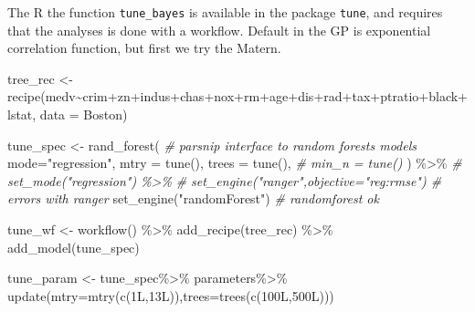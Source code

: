 \documentclass[
  ignorenonframetext,
]{beamer}
\newenvironment{Shaded}{\begin{snugshade}}{\end{snugshade}}
\newcommand{\AttributeTok}[1]{\textcolor[rgb]{0.77,0.63,0.00}{#1}}
\newcommand{\CommentTok}[1]{\textcolor[rgb]{0.56,0.35,0.01}{\textit{#1}}}
\newcommand{\FunctionTok}[1]{\textcolor[rgb]{0.00,0.00,0.00}{#1}}
\newcommand{\NormalTok}[1]{#1}
\newcommand{\OtherTok}[1]{\textcolor[rgb]{0.56,0.35,0.01}{#1}}
\newcommand{\SpecialCharTok}[1]{\textcolor[rgb]{0.00,0.00,0.00}{#1}}
\newcommand{\StringTok}[1]{\textcolor[rgb]{0.31,0.60,0.02}{#1}}
\begin{document}
\begin{frame}[fragile]
The R the function \texttt{tune\_bayes} is available in the package
\texttt{tune}, and requires that the analyses is done with a workflow.
Default in the GP is exponential correlation function, but first we try
the Matern.

\begin{Shaded}
\begin{Highlighting}[]
\NormalTok{tree\_rec }\OtherTok{\textless{}{-}} \FunctionTok{recipe}\NormalTok{(medv}\SpecialCharTok{\textasciitilde{}}\NormalTok{crim}\SpecialCharTok{+}\NormalTok{zn}\SpecialCharTok{+}\NormalTok{indus}\SpecialCharTok{+}\NormalTok{chas}\SpecialCharTok{+}\NormalTok{nox}\SpecialCharTok{+}\NormalTok{rm}\SpecialCharTok{+}\NormalTok{age}\SpecialCharTok{+}\NormalTok{dis}\SpecialCharTok{+}\NormalTok{rad}\SpecialCharTok{+}\NormalTok{tax}\SpecialCharTok{+}\NormalTok{ptratio}\SpecialCharTok{+}\NormalTok{black}\SpecialCharTok{+}\NormalTok{lstat, }\AttributeTok{data =}\NormalTok{ Boston)}

\NormalTok{tune\_spec }\OtherTok{\textless{}{-}} \FunctionTok{rand\_forest}\NormalTok{( }\CommentTok{\# parsnip interface to random forests models}
  \AttributeTok{mode=}\StringTok{"regression"}\NormalTok{,}
  \AttributeTok{mtry =} \FunctionTok{tune}\NormalTok{(),}
  \AttributeTok{trees =} \FunctionTok{tune}\NormalTok{(),}
\CommentTok{\#  min\_n = tune()}
\NormalTok{) }\SpecialCharTok{\%\textgreater{}\%}
\CommentTok{\#  set\_mode("regression") \%\textgreater{}\%}
\CommentTok{\#  set\_engine("ranger",objective="reg:rmse") \# errors with ranger}
  \FunctionTok{set\_engine}\NormalTok{(}\StringTok{"randomForest"}\NormalTok{) }\CommentTok{\# randomforest ok}

\NormalTok{tune\_wf }\OtherTok{\textless{}{-}} \FunctionTok{workflow}\NormalTok{() }\SpecialCharTok{\%\textgreater{}\%}
  \FunctionTok{add\_recipe}\NormalTok{(tree\_rec) }\SpecialCharTok{\%\textgreater{}\%}
  \FunctionTok{add\_model}\NormalTok{(tune\_spec)}

\NormalTok{tune\_param }\OtherTok{\textless{}{-}}\NormalTok{ tune\_spec}\SpecialCharTok{\%\textgreater{}\%} 
\NormalTok{  parameters}\SpecialCharTok{\%\textgreater{}\%} 
  \FunctionTok{update}\NormalTok{(}\AttributeTok{mtry=}\FunctionTok{mtry}\NormalTok{(}\FunctionTok{c}\NormalTok{(1L,13L)),}\AttributeTok{trees=}\FunctionTok{trees}\NormalTok{(}\FunctionTok{c}\NormalTok{(100L,500L)))}


\end{Highlighting}
\end{Shaded}
\end{frame}
\end{document}
